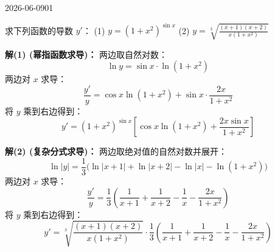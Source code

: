 \begin{mistake}{2026-06-09}{01}

\begin{problemcontent}
求下列函数的导数 \(y'\)：
(1) \(y = (1+x^2)^{\sin x}\)
(2) \(y = \sqrt[3]{\frac{(x+1)(x+2)}{x(1+x^2)}}\)
\end{problemcontent}

\begin{solutioncontent}
\textbf{解(1) (幂指函数求导)：}
两边取自然对数：
\[ \ln y = \sin x \cdot \ln(1+x^2) \]
两边对 \(x\) 求导：
\[ \frac{y'}{y} = \cos x \ln(1+x^2) + \sin x \cdot \frac{2x}{1+x^2} \]
将 \(y\) 乘到右边得到：
\[ y' = (1+x^2)^{\sin x} \left[ \cos x \ln(1+x^2) + \frac{2x \sin x}{1+x^2} \right] \]

\textbf{解(2) (复杂分式求导)：}
两边取绝对值的自然对数并展开：
\[ \ln|y| = \frac{1}{3} \Big( \ln|x+1| + \ln|x+2| - \ln|x| - \ln(1+x^2) \Big) \]
两边对 \(x\) 求导：
\[ \frac{y'}{y} = \frac{1}{3} \left( \frac{1}{x+1} + \frac{1}{x+2} - \frac{1}{x} - \frac{2x}{1+x^2} \right) \]
将 \(y\) 乘到右边得到：
\[ y' = \sqrt[3]{\frac{(x+1)(x+2)}{x(1+x^2)}} \cdot \frac{1}{3} \left( \frac{1}{x+1} + \frac{1}{x+2} - \frac{1}{x} - \frac{2x}{1+x^2} \right) \]
\end{solutioncontent}


\end{mistake}
